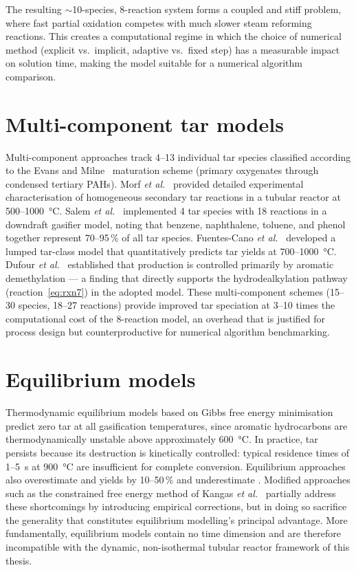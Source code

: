 The resulting \(\sim\)10-species, 8-reaction system forms a coupled and stiff problem, where fast partial oxidation competes with much slower steam reforming reactions. This creates a computational regime in which the choice of numerical method (explicit vs.\ implicit, adaptive vs.\ fixed step) has a measurable impact on solution time, making the model suitable for a numerical algorithm comparison.

\section{Multi-component tar models}\label{sec:multicomponent}

Multi-component approaches track 4--13 individual tar species classified according to the Evans and Milne~\cite{EvansMilne1987} maturation scheme (primary oxygenates through condensed tertiary PAHs). Morf \textit{et al.}~\cite{Morf2002} provided detailed experimental characterisation of homogeneous secondary tar reactions in a tubular reactor at 500--1000~\si{\degreeCelsius}. Salem \textit{et al.}~\cite{Salem2019} implemented 4 tar species with 18 reactions in a downdraft gasifier model, noting that benzene, naphthalene, toluene, and phenol together represent 70--95\,\% of all tar species. Fuentes-Cano \textit{et al.}~\cite{FuentesCano2016} developed a lumped tar-class model that quantitatively predicts tar yields at 700--1000~\si{\degreeCelsius}. Dufour \textit{et al.}~\cite{Dufour2011} established that  production is controlled primarily by aromatic demethylation --- a finding that directly supports the hydrodealkylation pathway (reaction~\eqref{eq:rxn7}) in the adopted model. These multi-component schemes (15--30 species, 18--27 reactions) provide improved tar speciation at 3--10 times the computational cost of the 8-reaction model, an overhead that is justified for process design but counterproductive for numerical algorithm benchmarking.

\section{Equilibrium models}\label{sec:equilibrium}

Thermodynamic equilibrium models based on Gibbs free energy minimisation predict zero tar at all gasification temperatures, since aromatic hydrocarbons are thermodynamically unstable above approximately \SI{600}{\degreeCelsius}. In practice, tar persists because its destruction is kinetically controlled: typical residence times of 1--5~s at \SI{900}{\degreeCelsius} are insufficient for complete conversion. Equilibrium approaches also overestimate  and  yields by 10--50\,\% and underestimate . Modified approaches such as the constrained free energy method of Kangas \textit{et al.}~\cite{Kangas2014} partially address these shortcomings by introducing empirical corrections, but in doing so sacrifice the generality that constitutes equilibrium modelling's principal advantage. More fundamentally, equilibrium models contain no time dimension and are therefore incompatible with the dynamic, non-isothermal tubular reactor framework of this thesis.

